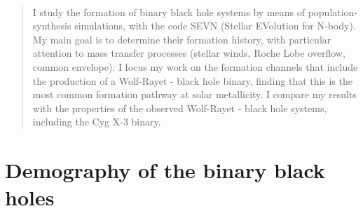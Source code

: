 \documentclass[a4paper,titlepage]{book}     	%
\newenvironment{abstract}{\newpage \thispagestyle{empty} \vspace*{3\baselineskip}
	\begin{center}\Large\textbf\abstractname\end{center}
	\begin{quotation}
	}{\end{quotation}\clearpage}
\begin{document}
\frontmatter

\begin{frontespizio}
	\Preambolo{\renewcommand{\frontinstitutionfont}{\fontsize{15}{12}\bfseries}}
	\Preambolo{\renewcommand{\frontdivisionfont}{\fontsize{16}{30}\selectfont}}
	\Preambolo{\renewcommand{\frontpretitlefont}{\fontsize{16}{20}\scshape}}
	\Preambolo{\renewcommand{\fronttitlefont}{\fontsize{19}{35}\bfseries}}
	\Preambolo{\renewcommand{\frontnamesfont}{\fontsize{15}{20}\bfseries}}
	\Preambolo{\renewcommand{\frontfixednamesfont}{\fontsize{13}{20}\selectfont}}

	\Rientro{2cm}
\end{frontespizio}	

\
\begin{abstract}
I study the formation of binary black hole systems by means of population-synthesis simulations, with the code SEVN (Stellar EVolution for N-body). My main goal is to determine their formation history, with particular attention to mass transfer processes (stellar winds, Roche Lobe overflow, common envelope). I focus my work on the formation channels that include the production of a Wolf-Rayet - black hole binary, finding that this is the most common formation pathway at solar metallicity. I compare my results with the properties of the observed Wolf-Rayet - black hole systems, including the Cyg X-3 binary.

\end{abstract}

\tableofcontents
{}

\mainmatter

\chapter{Demography of the binary black holes }
\end{document}
